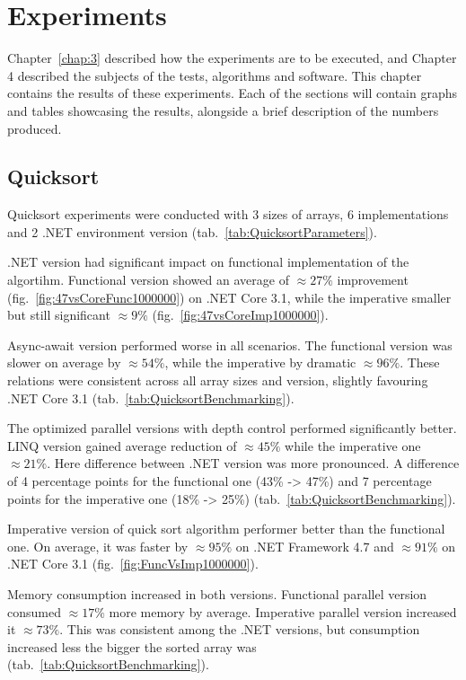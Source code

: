 \chapter{Experiments}
\label{chap:5}
Chapter~\ref{chap:3} described how the experiments are to be executed, and Chapter 4 described the subjects of the tests, algorithms and software. This chapter contains the results of these experiments. Each of the sections will contain graphs and tables showcasing the results, alongside a brief description of the numbers produced. 

\section{Quicksort}
\label{sec: QuickSort}
Quicksort experiments were conducted with 3 sizes of arrays, 6 implementations and 2 .NET environment version (tab.~\ref{tab:QuicksortParameters}). 

.NET version had significant impact on functional implementation of the algortihm. Functional version showed an average of $\approx 27\%$ improvement (fig.~\ref{fig:47vsCoreFunc1000000}) on .NET Core 3.1, while the imperative smaller but still significant  $\approx 9\%$ (fig.~\ref{fig:47vsCoreImp1000000}).

Async-await version performed worse in all scenarios. The functional version was slower on average by $\approx 54\%$, while the imperative by dramatic $\approx 96\%$. These relations were consistent across all array sizes and version, slightly favouring .NET Core 3.1 (tab.~\ref{tab:QuicksortBenchmarking}).

The optimized parallel versions with depth control performed significantly better. LINQ version gained average reduction of $\approx 45\%$ while the imperative one 
$\approx 21\%$. Here difference between .NET version was more pronounced. A difference of 4 percentage points for the functional one (43\% -> 47\%) and 7 percentage points for the imperative one (18\% -> 25\%) (tab.~\ref{tab:QuicksortBenchmarking}).

Imperative version of quick sort algorithm performer better than the functional one. On average, it was faster by $\approx 95\%$ on .NET Framework 4.7 and $\approx 91\%$ on .NET Core 3.1 (fig.~\ref{fig:FuncVsImp1000000}).

Memory consumption increased in both versions. Functional parallel version consumed $\approx 17\%$ more memory by average. Imperative parallel version increased it $\approx 73\%$. This was consistent among the .NET versions, but consumption increased less the bigger the sorted array was (tab.~\ref{tab:QuicksortBenchmarking}).

